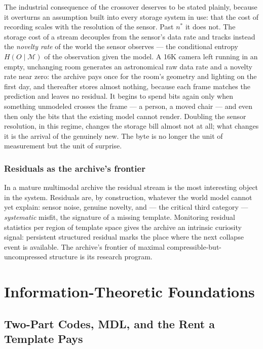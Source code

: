 \documentclass[11pt,oneside]{book}
\theoremstyle{remark}
\newcommand{\Mod}{\mathcal{M}}
\begin{document}
The industrial consequence of the crossover deserves to be stated
plainly, because it overturns an assumption built into every storage
system in use: that the cost of recording scales with the resolution of
the sensor. Past $n^\ast$ it does not. The storage cost of a stream
decouples from the sensor's data rate and tracks instead the
\emph{novelty rate} of the world the sensor observes --- the conditional
entropy $H(O \mid \Mod)$ of the observation given the model. A 16K
camera left running in an empty, unchanging room generates an
astronomical raw data rate and a novelty rate near zero: the archive
pays once for the room's geometry and lighting on the first day, and
thereafter stores almost nothing, because each frame matches the
prediction and leaves no residual. It begins to spend bits again only
when something unmodeled crosses the frame --- a person, a moved chair
--- and even then only the bits that the existing model cannot render.
Doubling the sensor resolution, in this regime, changes the storage bill
almost not at all; what changes it is the arrival of the genuinely new.
The byte is no longer the unit of measurement but the unit of surprise.

\section{Residuals as the archive's frontier}

In a mature multimodal archive the residual stream is the most
interesting object in the system. Residuals are, by construction,
whatever the world model cannot yet explain: sensor noise, genuine
novelty, and --- the critical third category --- \emph{systematic}
misfit, the signature of a missing template. Monitoring residual
statistics per region of template space gives the archive an intrinsic
curiosity signal: persistent structured residual marks the place where
the next collapse event is available. The archive's frontier of maximal
compressible-but-uncompressed structure is its research program.

\part{Information-Theoretic Foundations}

\chapter{Two-Part Codes, MDL, and the Rent a Template Pays}
\end{document}
